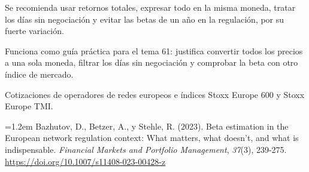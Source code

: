 \documentclass{article}
\newcommand{\cardtitlesize}{\fontsize{31.9}{38.3}\selectfont}
\newcommand{\smallsize}{\fontsize{22.1}{28.7}\selectfont}
\newcommand{\cardtitle}[2][navy]{{\color{#1}\cardtitlesize\bfseries\textls[110]{\MakeUppercase{#2}}}\par\vspace{7mm}}
\begin{document}
\vfill
\hspace*{34mm}\begin{minipage}{773mm}
\begin{tcbraster}[raster columns=3, raster equal height, raster column skip=16mm]
\begin{tcolorbox}[card, raster multicolumn=2]\cardtitle{Conclusiones}Se recomienda usar retornos totales, expresar todo en la misma moneda, tratar los días sin negociación y evitar las betas de un año en la regulación, por su fuerte variación.\end{tcolorbox}
\begin{tcolorbox}[card=gold, colback=goldSoft]\cardtitle{Aporte al tema 61}Funciona como guía práctica para el tema 61: justifica convertir todos los precios a una sola moneda, filtrar los días sin negociación y comprobar la beta con otro índice de mercado.\end{tcolorbox}
\end{tcbraster}
\end{minipage}

\vfill
\begin{tcolorbox}[enhanced, sharp corners, colback=navy, boxrule=0pt, width=\paperwidth,
  left=34mm, right=34mm, top=14mm, bottom=11mm,
  overlay={\fill[gold] (frame.north west) rectangle ([yshift=-5mm]frame.north east);}]
\begin{minipage}[c]{245mm}\raggedright
{\color{acento}\smallsize\bfseries{}}\par\vspace{5mm}
{\color{white}\smallsize Cotizaciones de operadores de redes europeos e índices Stoxx Europe 600 y Stoxx Europe TMI.}
\end{minipage}\hfill
\begin{minipage}[c]{385mm}\raggedright
{\color{acento}\smallsize\bfseries{}}\par\vspace{5mm}
{\color{white}\smallsize\hangindent=1.2em Bazhutov, D., Betzer, A., y Stehle, R. (2023). Beta estimation in the European network regulation context: What matters, what doesn't, and what is indispensable. \textit{Financial Markets and Portfolio Management}, \textit{37}(3), 239-275. \url{https://doi.org/10.1007/s11408-023-00428-z}\par}
\end{minipage}\hfill
\begin{minipage}[c]{100mm}\centering
{}\par\vspace{4mm}
{\color{acento}\fontsize{17}{21}\selectfont\bfseries{}}
\end{minipage}
\end{tcolorbox}
\end{document}
